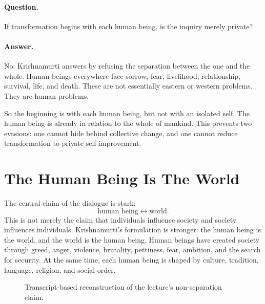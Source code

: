 \documentclass[11pt,oneside]{book}
\begin{document}
\paragraph{Question.}
If transformation begins with each human being, is the inquiry merely private?

\paragraph{Answer.}
No. Krishnamurti answers by refusing the separation between the one and the whole. Human beings everywhere face sorrow, fear, livelihood, relationship, survival, life, and death. These are not essentially eastern or western problems. They are human problems.

So the beginning is with each human being, but not with an isolated self. The human being is already in relation to the whole of mankind. This prevents two evasions: one cannot hide behind collective change, and one cannot reduce transformation to private self-improvement.

\section{The Human Being Is The World}

The central claim of the dialogue is stark:
\begin{equation}
\text{human being}
\leftrightarrow
\text{world}.
\end{equation}
This is not merely the claim that individuals influence society and society influences individuals. Krishnamurti's formulation is stronger: the human being is the world, and the world is the human being. Human beings have created society through greed, anger, violence, brutality, pettiness, fear, ambition, and the search for security. At the same time, each human being is shaped by culture, tradition, language, religion, and social order.

\begin{figure}
\centering
{}

Transcript-based reconstruction of the lecture's non-separation claim.
\end{figure}
\end{document}
